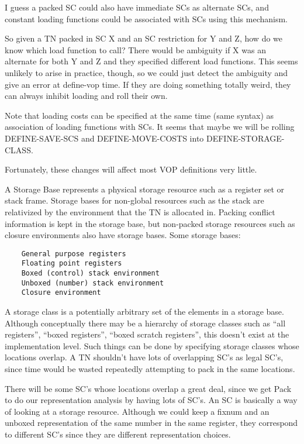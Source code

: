 I guess a packed SC could also have immediate SCs as alternate SCs, and
constant loading functions could be associated with SCs using this mechanism.

So given a TN packed in SC X and an SC restriction for Y and Z, how do we know
which load function to call?  There would be ambiguity if X was an alternate
for both Y and Z and they specified different load functions.  This seems
unlikely to arise in practice, though, so we could just detect the ambiguity
and give an error at define-vop time.  If they are doing something totally
weird, they can always inhibit loading and roll their own.

Note that loading costs can be specified at the same time (same syntax) as
association of loading functions with SCs.  It seems that maybe we will be
rolling DEFINE-SAVE-SCS and DEFINE-MOVE-COSTS into DEFINE-STORAGE-CLASS.

Fortunately, these changes will affect most VOP definitions very little.


A Storage Base represents a physical storage resource such as a register set or
stack frame.  Storage bases for non-global resources such as the stack are
relativized by the environment that the TN is allocated in.  Packing conflict
information is kept in the storage base, but non-packed storage resources such
as closure environments also have storage bases.
Some storage bases:
\begin{verbatim}
    General purpose registers
    Floating point registers
    Boxed (control) stack environment
    Unboxed (number) stack environment
    Closure environment
\end{verbatim}

A storage class is a potentially arbitrary set of the elements in a storage
base.  Although conceptually there may be a hierarchy of storage classes such
as ``all registers'', ``boxed registers'', ``boxed scratch registers'', this doesn't
exist at the implementation level.  Such things can be done by specifying
storage classes whose locations overlap.  A TN shouldn't have lots of
overlapping SC's as legal SC's, since time would be wasted repeatedly
attempting to pack in the same locations.

There will be some SC's whose locations overlap a great deal, since we get Pack
to do our representation analysis by having lots of SC's.  An SC is basically a
way of looking at a storage resource.  Although we could keep a fixnum and an
unboxed representation of the same number in the same register, they correspond
to different SC's since they are different representation choices.

